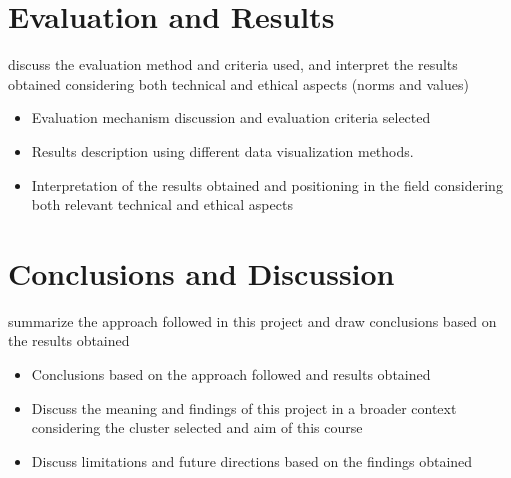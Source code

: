 \documentclass[]{article}
\begin{document}
\section{Evaluation and Results}
discuss the evaluation method and criteria used, and interpret the results obtained considering both technical and ethical aspects (norms and values)
\begin{itemize}
    \item Evaluation mechanism discussion and evaluation criteria selected
    \item Results description using different data visualization methods.
    \item Interpretation of the results obtained and positioning in the field considering both relevant technical and ethical aspects
\end{itemize}

\section{Conclusions and Discussion}
summarize the approach followed in this project and draw conclusions based on the results obtained
\begin{itemize}
    \item Conclusions based on the approach followed and results obtained
    \item Discuss the meaning and findings of this project in a broader context considering the cluster selected and aim of this course
    \item Discuss limitations and future directions based on the findings obtained
\end{itemize}

\printbibliography
\end{document}
